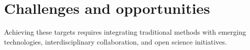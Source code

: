 \documentclass[pdflatex,sn-mathphys-num]{sn-jnl}%
\theoremstyle{thmstyleone}%
\theoremstyle{thmstyletwo}%
\theoremstyle{thmstylethree}%
\begin{document}







\section{Challenges and opportunities}\label{subsec2}
Achieving these targets requires integrating traditional methods with emerging technologies, interdisciplinary collaboration, and open science initiatives.
\end{document}
